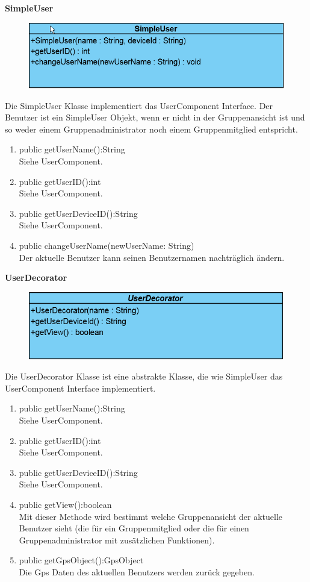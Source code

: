 \textbf{SimpleUser}
\begin{figure}[H]
	\includegraphics[scale = .5]{res/umlClasses/SimpleUser.png}
	\centering
\end{figure}
Die SimpleUser Klasse implementiert das UserComponent Interface. Der Benutzer ist ein SimpleUser Objekt, wenn er nicht in der Gruppenansicht ist und so weder einem Gruppenadministrator noch einem Gruppenmitglied entspricht.
\begin{enumerate}
	\item public getUserName():String\\
		Siehe UserComponent.
	\item public getUserID():int\\
		Siehe UserComponent.
	\item public getUserDeviceID():String\\
		Siehe UserComponent.
	\item public changeUserName(newUserName: String)\\
	Der aktuelle Benutzer kann seinen Benutzernamen nachträglich ändern.
\end{enumerate}

\textbf{UserDecorator}
\begin{figure}[H]
	\includegraphics[scale = .5]{res/umlClasses/UserDecorator.png}
	\centering
\end{figure}
Die UserDecorator Klasse ist eine abstrakte Klasse, die wie SimpleUser das UserComponent Interface implementiert. 
\begin{enumerate}
	\item public getUserName():String\\
		Siehe UserComponent.
	\item public getUserID():int\\
		Siehe UserComponent.
	\item public getUserDeviceID():String\\
		Siehe UserComponent.
	\item public getView():boolean\\
		Mit dieser Methode wird bestimmt welche Gruppenansicht der aktuelle Benutzer sieht (die für ein Gruppenmitglied oder die für einen Gruppenadministrator mit zusätzlichen Funktionen).
	\item public getGpsObject():GpsObject\\
		Die Gps Daten des aktuellen Benutzers werden zurück gegeben.
\end{enumerate}


